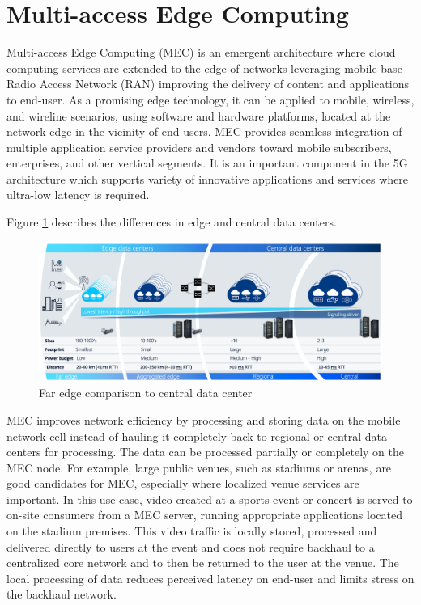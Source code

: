 

\section{Multi-access Edge Computing}

Multi-access Edge Computing (MEC) is an emergent architecture where cloud computing services are extended to the edge of networks leveraging mobile base Radio Access Network (RAN) improving the delivery of content and applications to end-user. As a promising edge technology, it can be applied to mobile, wireless, and wireline scenarios, using software and hardware platforms, located at the network edge in the vicinity of end-users. MEC provides seamless integration of multiple application service providers and vendors toward mobile subscribers, enterprises, and other vertical segments. It is an important component in the 5G architecture which supports variety of innovative applications and services where ultra-low latency is required. \cite{Abbas2018}

Figure \ref{fig:AirFrame} describes the differences in edge and central data centers.  

\begin{figure}[ht]
  \begin{center}
    \includegraphics[width=13.5cm]{images/AirFrame.png}
    \caption{Far edge comparison to central data center \cite{AirFrameOpenEdgeServer}}
    \label{fig:AirFrame}
  \end{center}
\end{figure}

MEC improves network efficiency by processing and storing data on the mobile network cell instead of hauling it completely back to regional or central data centers for processing. The data can be processed partially or completely on the MEC node. For example, large public venues, such as stadiums or arenas, are good candidates for MEC, especially where localized venue services are important. In this use case, video created at a sports event or concert is served to on-site consumers from a MEC server, running appropriate applications located on the stadium premises. This video traffic is locally stored, processed and delivered directly to users at the event and does not require backhaul to a centralized core network and to then be returned to the user at the venue. The local processing of data reduces perceived latency on end-user and limits stress on the backhaul network. \cite{Brown2016}

